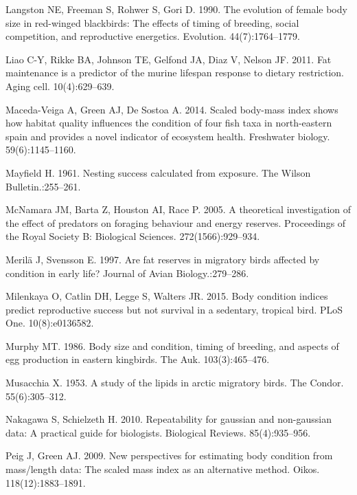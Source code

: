 \documentclass[
]{article}
\begin{document}
\leavevmode\hypertarget{ref-langston1990evolution}{}%
Langston NE, Freeman S, Rohwer S, Gori D. 1990. The evolution of female
body size in red-winged blackbirds: The effects of timing of breeding,
social competition, and reproductive energetics. Evolution.
44(7):1764--1779.

\leavevmode\hypertarget{ref-liao2011fat}{}%
Liao C-Y, Rikke BA, Johnson TE, Gelfond JA, Diaz V, Nelson JF. 2011. Fat
maintenance is a predictor of the murine lifespan response to dietary
restriction. Aging cell. 10(4):629--639.

\leavevmode\hypertarget{ref-maceda2014scaled}{}%
Maceda-Veiga A, Green AJ, De Sostoa A. 2014. Scaled body-mass index
shows how habitat quality influences the condition of four fish taxa in
north-eastern spain and provides a novel indicator of ecosystem health.
Freshwater biology. 59(6):1145--1160.

\leavevmode\hypertarget{ref-mayfield1961nesting}{}%
Mayfield H. 1961. Nesting success calculated from exposure. The Wilson
Bulletin.:255--261.

\leavevmode\hypertarget{ref-mcnamara2005theoretical}{}%
McNamara JM, Barta Z, Houston AI, Race P. 2005. A theoretical
investigation of the effect of predators on foraging behaviour and
energy reserves. Proceedings of the Royal Society B: Biological
Sciences. 272(1566):929--934.

\leavevmode\hypertarget{ref-merila1997fat}{}%
Merilä J, Svensson E. 1997. Are fat reserves in migratory birds affected
by condition in early life? Journal of Avian Biology.:279--286.

\leavevmode\hypertarget{ref-milenkaya2015body}{}%
Milenkaya O, Catlin DH, Legge S, Walters JR. 2015. Body condition
indices predict reproductive success but not survival in a sedentary,
tropical bird. PLoS One. 10(8):e0136582.

\leavevmode\hypertarget{ref-murphy1986body}{}%
Murphy MT. 1986. Body size and condition, timing of breeding, and
aspects of egg production in eastern kingbirds. The Auk.
103(3):465--476.

\leavevmode\hypertarget{ref-musacchia1953study}{}%
Musacchia X. 1953. A study of the lipids in arctic migratory birds. The
Condor. 55(6):305--312.

\leavevmode\hypertarget{ref-nakagawa2010repeatability}{}%
Nakagawa S, Schielzeth H. 2010. Repeatability for gaussian and
non-gaussian data: A practical guide for biologists. Biological Reviews.
85(4):935--956.

\leavevmode\hypertarget{ref-peig2009new}{}%
Peig J, Green AJ. 2009. New perspectives for estimating body condition
from mass/length data: The scaled mass index as an alternative method.
Oikos. 118(12):1883--1891.
\end{document}
